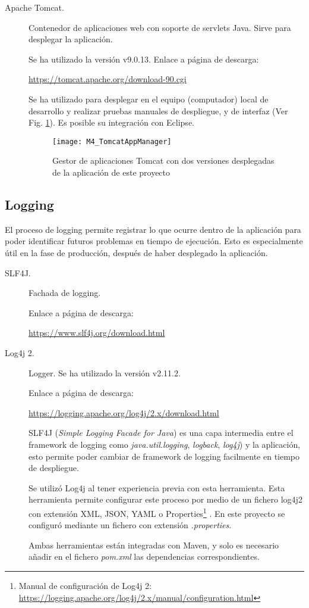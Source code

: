 \begin{description}
	\item[Apache Tomcat.] Contenedor de aplicaciones web con soporte de servlets Java. Sirve para desplegar la aplicación.
	
		Se ha utilizado la versión  v9.0.13. Enlace a página de descarga:
		
		\url{https://tomcat.apache.org/download-90.cgi}
		
		Se ha utilizado para desplegar en el equipo (computador) local de desarrollo y realizar pruebas manuales de despliegue, y de interfaz (Ver Fig. \ref{fig:M4_TomcatAppManager}). Es posible su integración con Eclipse.
		
		\begin{figure}[!h]
			\centering
			\texttt{[image: M4\_TomcatAppManager]}
			\caption{Gestor de aplicaciones Tomcat con dos versiones desplegadas de la aplicación de este proyecto}\label{fig:M4_TomcatAppManager}
		\end{figure}
		\FloatBarrier
		
\end{description}
\subsection{Logging}
El proceso de logging permite registrar lo que ocurre dentro de la aplicación para poder identificar futuros problemas en tiempo de ejecución. Esto es especialmente útil en la fase de producción, después de haber desplegado la aplicación.
\begin{description}
	\item[SLF4J.] Fachada de logging.
	
		Enlace a página de descarga:
	
		\url{https://www.slf4j.org/download.html}
	
	\item[Log4j 2.] Logger. Se ha utilizado la versión  v2.11.2.
	
	 	Enlace a página de descarga:
	
	 	\url{https://logging.apache.org/log4j/2.x/download.html}
	
		SLF4J (\textit{Simple Logging Facade for Java}) es una capa intermedia entre el framework de logging como \textit{java.util.logging}, \textit{logback}, \textit{log4j}) y la aplicación, esto permite poder cambiar de framework de logging facilmente en tiempo de despliegue.
		
		Se utilizó Log4j al tener experiencia previa con esta herramienta. Esta herramienta permite configurar este proceso por medio de un fichero log4j2 con extensión XML, JSON, YAML o Properties\footnote{Manual de configuración de Log4j 2: \url{https://logging.apache.org/log4j/2.x/manual/configuration.html}} \citep{noauthor_log4j_nodate}. En este proyecto se configuró mediante un fichero con extensión \textit{.properties}. 
		
		Ambas herramientas están integradas con Maven, y solo es necesario añadir en el fichero \textit{pom.xml} las dependencias correspondientes.
	
\end{description}
